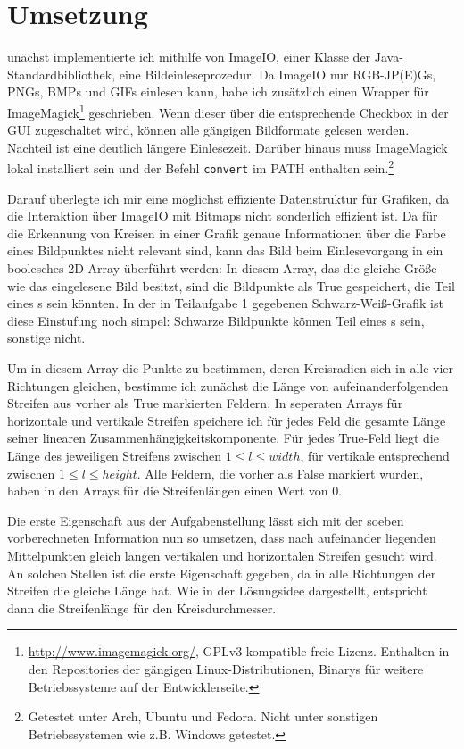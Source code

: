 \section{Umsetzung}
unächst implementierte ich mithilfe von ImageIO, einer Klasse der Java-Standardbibliothek, eine Bildeinleseprozedur. Da ImageIO nur RGB-JP(E)Gs, PNGs, BMPs und GIFs einlesen kann, habe ich zusätzlich einen Wrapper für ImageMagick\footnote{\url{http://www.imagemagick.org/}, GPLv3-kompatible freie Lizenz. Enthalten in den Repositories der gängigen Linux-Distributionen, Binarys für weitere Betriebssysteme auf der Entwicklerseite.} geschrieben. Wenn dieser über die entsprechende Checkbox in der GUI zugeschaltet wird, können alle gängigen Bildformate gelesen werden. Nachteil ist eine deutlich längere Einlesezeit. Darüber hinaus muss ImageMagick lokal installiert sein und der Befehl \texttt{convert} im PATH enthalten sein.\footnote{Getestet unter Arch, Ubuntu und Fedora. Nicht unter sonstigen Betriebssystemen wie z.B. Windows getestet.} 

Darauf überlegte ich mir eine möglichst effiziente Datenstruktur für Grafiken, da die Interaktion über ImageIO mit Bitmaps nicht sonderlich effizient ist. Da für die Erkennung von Kreisen in einer Grafik genaue Informationen über die Farbe eines Bildpunktes nicht relevant sind, kann das Bild beim Einlesevorgang in ein boolesches 2D-Array überführt werden: In diesem Array, das die gleiche Größe wie das eingelesene Bild besitzt, sind die Bildpunkte als True gespeichert, die Teil eines \task{}s sein könnten. In der in Teilaufgabe 1 gegebenen Schwarz-Weiß-Grafik ist diese Einstufung noch simpel: Schwarze Bildpunkte können Teil eines \task{}s sein, sonstige nicht.

Um in diesem Array die Punkte zu bestimmen, deren Kreisradien sich in alle vier Richtungen gleichen, bestimme ich zunächst die Länge von aufeinanderfolgenden Streifen aus vorher als True markierten Feldern. In seperaten Arrays für horizontale und vertikale Streifen speichere ich für jedes Feld die gesamte Länge seiner linearen Zusammenhängigkeitskomponente.
Für jedes True-Feld liegt die Länge des jeweiligen Streifens zwischen \(1 \le l \le width\), für vertikale entsprechend zwischen \(1 \le l \le height\). Alle Feldern, die vorher als False markiert wurden, haben in den Arrays für die Streifenlängen einen Wert von 0. 

Die erste Eigenschaft aus der Aufgabenstellung lässt sich mit der soeben vorberechneten Information nun so umsetzen, dass nach aufeinander liegenden Mittelpunkten gleich langen vertikalen und horizontalen Streifen gesucht wird. An solchen Stellen ist die erste Eigenschaft gegeben, da in alle Richtungen der Streifen die gleiche Länge hat. Wie in der Lösungsidee dargestellt, entspricht dann die Streifenlänge für den Kreisdurchmesser.

